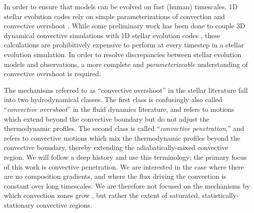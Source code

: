 \documentclass[twocolumn]{aastex631}
\begin{document}
In order to ensure that models can be evolved on fast (human) timescales, 1D stellar evolution codes rely on simple parameterizations of convection \citep[e.g., mixing length theory,][]{bohm-vitense1958} and convective overshoot \citep{shaviv_salpeter_1973, maeder1975, herwig2000, paxton_etal_2011, paxton_etal_2013, paxton_etal_2018, paxton_etal_2019}.
While some preliminary work has been done to couple 3D dynamical convective simulations with 1D stellar evolution codes \citep{jorgensen_weiss_2019}, these calculations are prohibitively expensive to perform at every timestep in a stellar evolution simulation.
In order to resolve discrepancies between stellar evolution models and observations, a more complete and \emph{parameterizeable} understanding of convective overshoot is required.

The mechanisms referred to as ``convective overshoot'' in the stellar literature fall into two hydrodynamical classes.
The first class is confusingly also called ``\emph{convective overshoot}'' in the fluid dynamics literature, and refers to motions which extend beyond the convective boundary but do not adjust the thermodynamic profiles.
The second class is called ``\emph{convective penetration},'' and refers to convective motions which mix the thermodynamic profiles beyond the convective boundary, thereby extending the adiabatically-mixed convective region.
We will follow a deep history \citep{zahn1991, brummell_etal_2002, korre_etal_2019} and use this terminology; the primary focus of this work is convective penetration.
We are interested in the case where there are no composition gradients, and where the flux driving the convection is constant over long timescales.
We are therefore not focused on the mechanisms by which convection zones grow \citep[e.g., entrainment, ][]{meakin_arnett_2007, viallet_etal_2013, cristini_etal_2017, fuentes_cumming_2020, horst_etal_2021}, but rather the extent of saturated, statistically-stationary convective regions.
\end{document}
